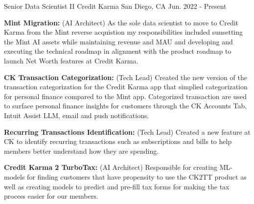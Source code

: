 


\begin{cventries}




\cventry
    {Senior Data Scientist II} %
    {Credit Karma} %
    {San Diego, CA} %
    {Jun. 2022 - Present} %
    {\begin{cvitems}
        \setlength\itemsep{.15em}
        \item { \textbf{Mint Migration: } (AI Architect) As the sole data scientist to move to Credit Karma from the Mint reverse acquistion my responsibilities included sunsetting the Mint AI assets while maintaining revenue and MAU and developing and executing the technical roadmap in alignment with the product roadmap to launch Net Worth features at Credit Karma.  }
        \item { \textbf{CK Transaction Categorization: } (Tech Lead) Created the new version of the transaction categorization for the Credit Karma app that simplied categorization for personal finance compared to the Mint app. Categorized transaction are used to surface personal finance insights for customers
        through the CK Accounts Tab, Intuit Assist LLM, email and push notifications.}
         \item { \textbf{Recurring Transactions Identification: } (Tech Lead) Created a new feature at CK to identify recurring transactions such as subscriptions and bills to help members better understand how they are spending.}
         \item { \textbf{Credit Karma 2 TurboTax:} (AI Architect) Responsible for creating ML-models for finding customers that have propensity to use the CK2TT product as well as creating models to predict and pre-fill tax forms for making the tax process easier for our members. }
     \end{cvitems}}



\end{cventries}

